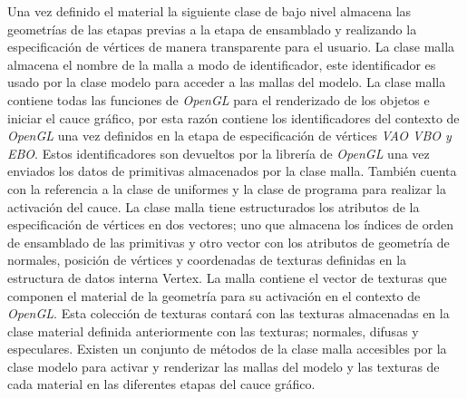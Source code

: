\documentclass[a4paper]{book}
\begin{document}
Una vez definido el material la siguiente clase de bajo nivel almacena las geometrías de las etapas previas a la etapa de ensamblado y
realizando la especificación de vértices de manera transparente para el usuario. La clase malla almacena el nombre de la malla a modo de
identificador, este identificador es usado por la clase modelo para acceder a las mallas del modelo. La clase malla contiene
todas las funciones de \textit{OpenGL} para el renderizado de los objetos e iniciar el cauce gráfico, por esta razón contiene los
identificadores del contexto de \textit{OpenGL} una vez definidos en la etapa de especificación de vértices \textit{VAO VBO y EBO}. Estos
identificadores son devueltos por la librería de \textit{OpenGL} una vez enviados los datos de primitivas almacenados por la clase malla.
También cuenta con la referencia a la clase de uniformes y la clase de programa para realizar la activación del cauce. La clase malla tiene
estructurados los atributos de la especificación de vértices en dos vectores; uno que almacena los índices de
orden de ensamblado de las primitivas y otro vector con los atributos de geometría de normales, posición de vértices y coordenadas de texturas
definidas en la estructura de datos interna Vertex. La malla contiene el vector de texturas que componen el material de la geometría para su
activación en el contexto de \textit{OpenGL}. Esta colección de texturas contará con las texturas almacenadas en la clase material definida 
anteriormente con las texturas; normales, difusas y especulares. Existen un conjunto de métodos de la clase malla accesibles por la clase modelo
para activar y renderizar las mallas del modelo y las texturas de cada material en las diferentes etapas del cauce gráfico.
\end{document}
